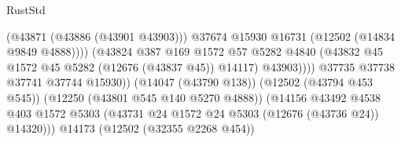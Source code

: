 \begin{lexlean}{RustStd}
\begin{coremodule}
                                                          (@43871 (@43886 (@43901 @43903)))
                                                          @37674
                                                          @15930
                                                          @16731
                                                          (@12502 (@14834 @9849 @4888))))
                                                      (@43824
                                                        @387
                                                        @169
                                                        @1572
                                                        @57
                                                        @5282
                                                        @4840
                                                        (@43832
                                                          @45
                                                          @1572
                                                          @45
                                                          @5282
                                                          (@12676 (@43837 @45))
                                                          @14117)
                                                        @43903))))
                                                @37735
                                                @37738
                                                @37741
                                                @37744
                                                @15930))
                                            (@14047 (@43790 @138))
                                            (@12502 (@43794 @453 @545))
                                            (@12250 (@43801 @545 @140 @5270 @4888))
                                            (@14156
                                              @43492
                                              @4538
                                              @403
                                              @1572
                                              @5303
                                              (@43731
                                                @24
                                                @1572
                                                @24
                                                @5303
                                                (@12676 (@43736 @24))
                                                @14320)))
                                          @14173
                                          (@12502 (@32355 @2268 @454))

\end{coremodule}
\end{lexlean}
